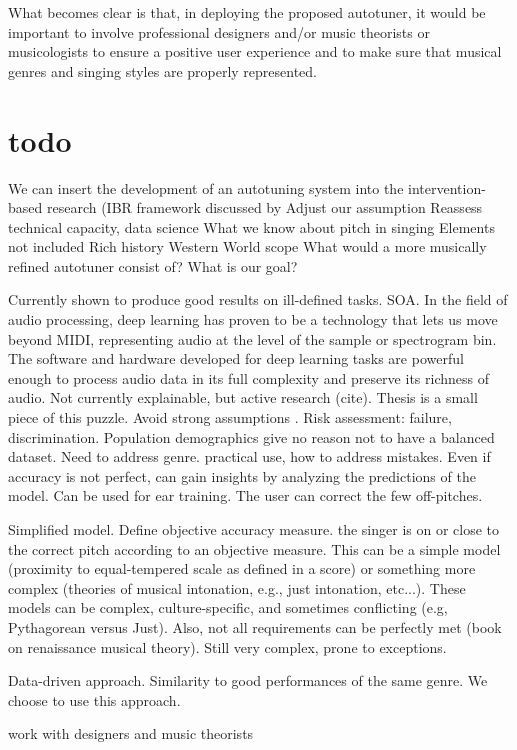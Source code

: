 What becomes clear is that, in deploying the proposed autotuner, it would be important to involve professional designers and/or music theorists or musicologists to ensure a positive user experience and to make sure that musical genres and singing styles are properly represented.

\section{todo}

We can insert the development of an autotuning system into the intervention-based research (IBR framework discussed by
Adjust our assumption
Reassess technical capacity, data science
What we know about pitch in singing
Elements not included
Rich history
Western World scope
What would a more musically refined autotuner consist of?
What is our goal?

Currently shown to produce good results on ill-defined tasks. SOA. 
In the field of audio processing, deep learning has proven to be a technology that lets us move beyond MIDI, representing audio at the level of the sample or spectrogram bin. The software and hardware developed for deep learning tasks are powerful enough to process audio data in its full complexity and preserve its richness of audio.
Not currently explainable, but active research (cite).
Thesis is a small piece of this puzzle.
Avoid strong assumptions \cite{wager2019causal}.
Risk assessment: failure, discrimination.
Population demographics give no reason not to have a balanced dataset. Need to address genre.
practical use, how to address mistakes.
Even if accuracy is not perfect, can gain insights by analyzing the predictions of the model. Can be used for ear training. The user can correct the few off-pitches.

Simplified model. Define objective accuracy measure. the singer is on or close to the correct pitch according to an objective measure. This can be a simple model (proximity to equal-tempered scale as defined in a score) or something more complex (theories of musical intonation, e.g., just intonation, etc...). These models can be complex, culture-specific, and sometimes conflicting (e.g, Pythagorean versus Just). Also, not all requirements can be perfectly met (book on renaissance musical theory). Still very complex, prone to exceptions. 

Data-driven approach. Similarity to good performances of the same genre. We choose to use this approach.

work with designers and music theorists
